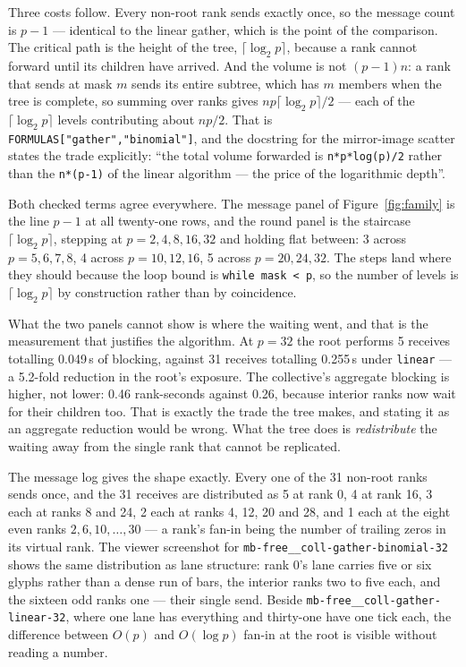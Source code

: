 \documentclass[11pt]{article}
\begin{document}
Three costs follow. Every non-root rank sends exactly once, so the message count is $p-1$ ---
identical to the linear gather, which is the point of the comparison. The critical path is the
height of the tree, $\lceil\log_2 p\rceil$, because a rank cannot forward until its children have
arrived. And the volume is not $(p-1)n$: a rank that sends at mask $m$ sends its entire subtree,
which has $m$ members when the tree is complete, so summing over ranks gives
$np\lceil\log_2 p\rceil/2$ --- each of the $\lceil\log_2 p\rceil$ levels contributing about
$np/2$. That is \texttt{FORMULAS["gather","binomial"]}, and the docstring for the mirror-image
scatter states the trade explicitly: ``the total volume forwarded is \texttt{n*p*log(p)/2} rather
than the \texttt{n*(p-1)} of the linear algorithm --- the price of the logarithmic depth''.

Both checked terms agree everywhere. The message panel of Figure~\ref{fig:family} is the line
$p-1$ at all twenty-one rows, and the round panel is the staircase $\lceil\log_2 p\rceil$,
stepping at $p = 2, 4, 8, 16, 32$ and holding flat between: 3 across $p = 5,6,7,8$, 4 across
$p = 10,12,16$, 5 across $p = 20,24,32$. The steps land where they should because the loop bound
is \texttt{while mask < p}, so the number of levels is $\lceil\log_2 p\rceil$ by construction
rather than by coincidence.

What the two panels cannot show is where the waiting went, and that is the measurement that
justifies the algorithm. At $p=32$ the root performs 5 receives totalling 0.049\,s of blocking,
against 31 receives totalling 0.255\,s under \texttt{linear} --- a 5.2-fold reduction in the
root's exposure. The collective's aggregate blocking is higher, not lower: 0.46 rank-seconds
against 0.26, because interior ranks now wait for their children too. That is exactly the trade
the tree makes, and stating it as an aggregate reduction would be wrong. What the tree does is
\emph{redistribute} the waiting away from the single rank that cannot be replicated.

The message log gives the shape exactly. Every one of the 31 non-root ranks sends once, and the 31
receives are distributed as 5 at rank 0, 4 at rank 16, 3 each at ranks 8 and 24, 2 each at ranks 4,
12, 20 and 28, and 1 each at the eight even ranks $2, 6, 10, \ldots, 30$ --- a rank's fan-in being
the number of trailing zeros in its virtual rank. The viewer screenshot for
\texttt{mb-free\_\_coll-gather-binomial-32} shows the same distribution as lane structure: rank 0's
lane carries five or six glyphs rather than a dense run of bars, the interior ranks two to five
each, and the sixteen odd ranks one --- their single send. Beside
\texttt{mb-free\_\_coll-gather-linear-32}, where one lane has everything and thirty-one have one
tick each, the difference between $O(p)$ and $O(\log p)$ fan-in at the root is visible without
reading a number.
\end{document}
